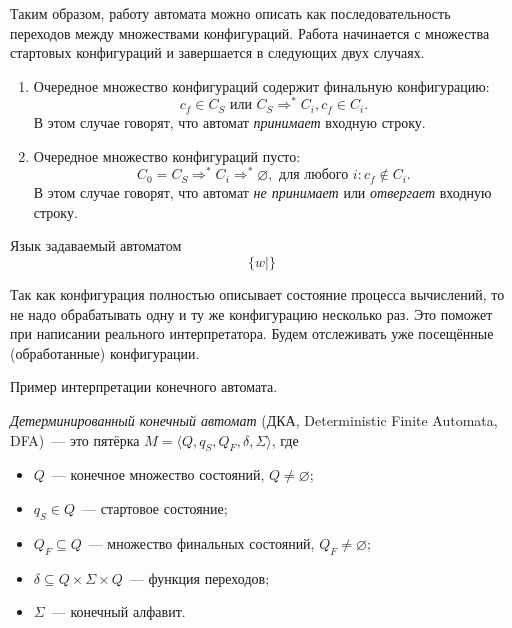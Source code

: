 Таким образом, работу автомата можно описать как последовательность переходов между множествами конфигураций. 
Работа начинается с множества стартовых конфигураций и завершается в следующих двух случаях.
\begin{enumerate}
    \item Очередное множество конфигураций содержит финальную конфигурацию:
    $$c_f \in C_S \text{ или } C_S \Rightarrow^* C_i, c_f \in C_i.$$ В этом случае говорят, что автомат \textit{принимает} входную строку.
    \item Очередное множество конфигураций пусто:
    $$C_0 = C_S \Rightarrow^* C_i \Rightarrow^* \varnothing, \text{ для любого } i: c_f \notin C_i.$$ 
    В этом случае говорят, что автомат \textit{не принимает} или \textit{отвергает} входную строку.
\end{enumerate} 

\begin{definition}
    Язык задаваемый автоматом $$\{w \mid \}$$
\end{definition}

Так как конфигурация полностью описывает состояние процесса вычислений, то не надо обрабатывать одну и ту же конфигурацию несколько раз. 
Это поможет при написании реального интерпретатора. 
Будем отслеживать уже посещённые (обработанные) конфигурации. 

\begin{example}
    Пример интерпретации конечного автомата.
\end{example}

\begin{definition}
    \label{def:DeterminicticFiniteAutomata}
    \emph{Детерминированный конечный автомат} (ДКА, Deterministic Finite Automata, DFA)~--- это пятёрка $M = \langle Q, q_S, Q_F, \delta, \Sigma \rangle$, где
    \begin{itemize}
        \item $Q$~--- конечное множество состояний, $Q \neq \varnothing$;
        \item $q_S \in Q$~--- стартовое состояние;
        \item $Q_F \subseteq Q$~--- множество финальных состояний, $Q_F \neq \varnothing$;
        \item $\delta \subseteq Q \times \Sigma \times Q$~--- функция переходов;
        \item $\Sigma$~--- конечный алфавит.
    \end{itemize}
\end{definition}

